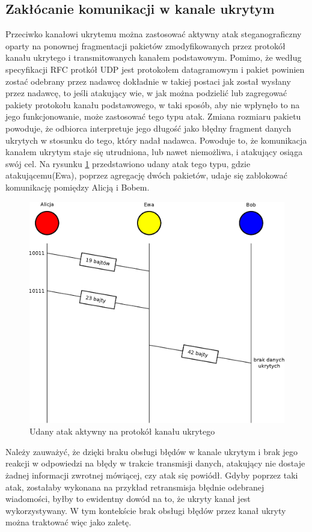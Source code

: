 \documentclass[a4paper, twoside, 12pt]{report}
\begin{document}
       \subsection{Zakłócanie komunikacji w kanale ukrytym}
       Przeciwko kanałowi ukrytemu można zastosować aktywny atak steganograficzny
       oparty na ponownej fragmentacji pakietów zmodyfikowanych przez protokół
       kanału ukrytego i transmitowanych kanałem podstawowym. Pomimo, że według
       specyfikacji RFC protkół UDP jest protokołem datagramowym i pakiet powinien
       zostać odebrany przez nadawcę dokładnie w takiej postaci jak został wysłany przez
       nadawcę, to jeśli atakujący wie, w jak można podzielić lub zagregować
       pakiety protokołu kanału podstawowego, w taki sposób, aby nie wpłynęło to na
       jego funkcjonowanie, może zastosować tego typu atak. Zmiana rozmiaru pakietu
       powoduje, że odbiorca interpretuje jego długość jako błędny fragment danych
       ukrytych w stosunku do tego, który nadał nadawca. Powoduje to, że komunikacja
       kanałem ukrytym staje się utrudniona, lub nawet niemożliwa, i atakujący osiąga
       swój cel. Na rysunku \ref{UDANYATAKAKTYWNY} przedstawiono udany atak tego typu,
       gdzie atakującemu(Ewa), poprzez agregację dwóch pakietów,
       udaje się zablokować komunikację pomiędzy Alicją i Bobem.
        \begin{figure}[h]
                \centering
                \includegraphics[scale=0.7]{udany_atak}
                \caption{Udany atak aktywny na protokół kanału ukrytego}
                \label{UDANYATAKAKTYWNY}
        \end{figure}
       Należy zauważyć, że dzięki braku obsługi błędów w kanale ukrytym
       i brak jego reakcji w odpowiedzi na błędy w trakcie transmisji danych, atakujący
       nie dostaje żadnej informacji zwrotnej mówiącej, czy atak się powiódł. Gdyby
       poprzez taki atak, zostałaby wykonana na przykład retransmisja błędnie odebranej
       wiadomości, byłby to ewidentny dowód na to, że ukryty kanał jest wykorzystywany.
       W tym kontekście brak obsługi błędów przez kanał ukryty można traktować więc
       jako zaletę.
\end{document}
